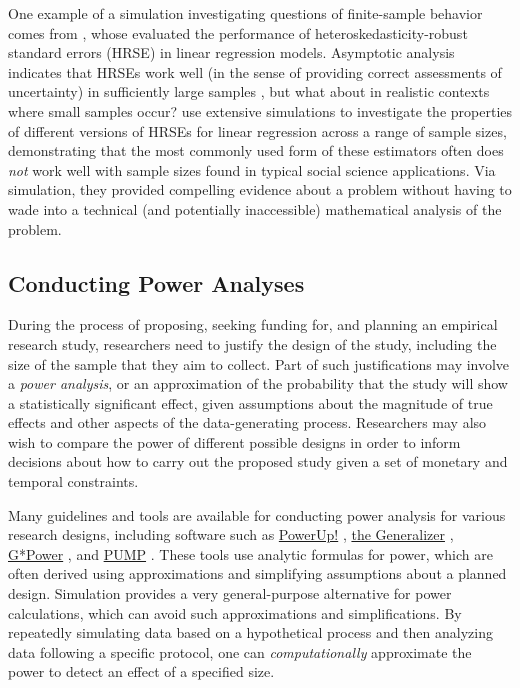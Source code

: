 \documentclass[
]{book}
\begin{document}
One example of a simulation investigating questions of finite-sample behavior comes from \citet{longUsingHeteroscedasticityConsistent2000}, whose evaluated the performance of heteroskedasticity-robust standard errors (HRSE) in linear regression models.
Asymptotic analysis indicates that HRSEs work well (in the sense of providing correct assessments of uncertainty) in sufficiently large samples \citep{White1980heteroskedasticity}, but what about in realistic contexts where small samples occur?
\citet{longUsingHeteroscedasticityConsistent2000} use extensive simulations to investigate the properties of different versions of HRSEs for linear regression across a range of sample sizes, demonstrating that the most commonly used form of these estimators often does \emph{not} work well with sample sizes found in typical social science applications.
Via simulation, they provided compelling evidence about a problem without having to wade into a technical (and potentially inaccessible) mathematical analysis of the problem.

\subsection{Conducting Power Analyses}\label{conducting-power-analyses}

During the process of proposing, seeking funding for, and planning an empirical research study, researchers need to justify the design of the study, including the size of the sample that they aim to collect.
Part of such justifications may involve a \emph{power analysis}, or an approximation of the probability that the study will show a statistically significant effect, given assumptions about the magnitude of true effects and other aspects of the data-generating process.
Researchers may also wish to compare the power of different possible designs in order to inform decisions about how to carry out the proposed study given a set of monetary and temporal constraints.

Many guidelines and tools are available for conducting power analysis for various research designs, including software such as \href{https://www.causalevaluation.org/power-analysis.html}{PowerUp!} \citep{dong2013PowerUpToolCalculating}, \href{https://www.thegeneralizer.org/}{the Generalizer} \citep{tipton2014stratified}, \href{https://www.psychologie.hhu.de/arbeitsgruppen/allgemeine-psychologie-und-arbeitspsychologie/gpower}{G*Power} \citep{faul2009StatisticalPowerAnalyses}, and \href{https://cran.r-project.org/web//packages/PUMP/index.html}{PUMP} \citep{hunter2023PowerMultiplicityProject}.
These tools use analytic formulas for power, which are often derived using approximations and simplifying assumptions about a planned design. Simulation provides a very general-purpose alternative for power calculations, which can avoid such approximations and simplifications.
By repeatedly simulating data based on a hypothetical process and then analyzing data following a specific protocol, one can \emph{computationally} approximate the power to detect an effect of a specified size.
\end{document}
